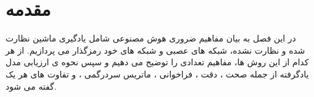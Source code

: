 \section{مقدمه}


در این فصل به بیان مفاهیم ضروری هوش مصنوعی شامل یادگیری ماشین نظارت شده و نظارت نشده، شبکه های عصبی و شبکه های خود رمزگذار می پردازیم. از هر کدام از این روش ها، مفاهیم تعدادی را توضیح می دهیم و
سپس نحوه ی ارزیابی مدل یادگرفته از جمله صحت
،
دقت
،
فراخوانی
،
ماتریس سردرگمی
،
و تفاوت های هر یک گفته می شود.

